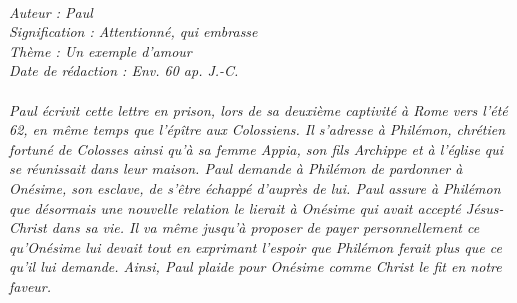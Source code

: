 \BFont
\noindent\hrulefill
{\footnotesize
\textit{
\bigskip
{\centering{}
\\Auteur : Paul
\\Signification : Attentionné, qui embrasse
\\Thème : Un exemple d'amour
\\Date de rédaction : Env. 60 ap. J.-C.\\}
}
\textit{
\\Paul écrivit cette lettre en prison, lors de sa deuxième captivité à Rome vers l’été 62, en même temps que l’épître aux Colossiens. Il s’adresse à Philémon, chrétien fortuné de Colosses ainsi qu’à sa femme Appia, son fils Archippe et à l’église qui se réunissait dans leur maison. Paul demande à Philémon de pardonner à Onésime, son esclave, de s’être échappé d’auprès de lui. Paul assure à Philémon que désormais une nouvelle relation le lierait à Onésime qui avait accepté Jésus-Christ dans sa vie. Il va même jusqu’à proposer de payer personnellement ce qu’Onésime lui devait tout en exprimant l’espoir que Philémon ferait plus que ce qu’il lui demande. Ainsi, Paul plaide pour Onésime comme Christ le fit en notre faveur.\bigskip
}
}
\par\nobreak\noindent\hrulefill
